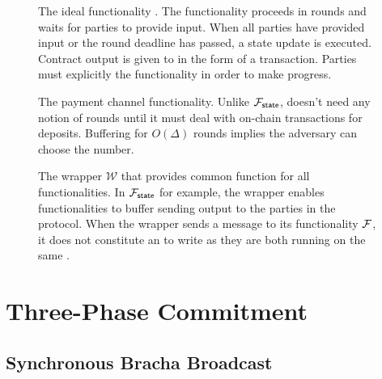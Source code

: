 \documentclass[11pt]{article}
\begin{document}
\begin{figure}
	
	\caption{The ideal functionality \Fstate. The functionality proceeds in rounds and waits for parties to provide input. When all parties have provided input or the round deadline has passed, a state update is executed. Contract output is given to \Gledger in the form of a transaction. Parties must explicitly  the functionality in order to make progress. }
\end{figure}

\begin{figure}
	
	\caption{The payment channel functionality. Unlike $\mathcal{F}_{{\mathsf {state}}}$, doesn't need any notion of rounds until it must deal with on-chain transactions for deposits. Buffering for $O(\Delta)$ rounds implies the adversary can choose the number.}
\end{figure}

\begin{figure}
	
	\caption{The wrapper $\mathcal{W}$ that provides common function for all functionalities. In $\mathcal{F}_{{\mathsf {state}}}$ for example, the wrapper enables functionalities to buffer sending output to the parties in the protocol. When the wrapper sends a message to its functionality $\mathcal{F}$, it does not constitute an  to  write as they are both running on the same .}
\end{figure}

\begin{figure}
	
\end{figure}

\begin{figure}
	
\end{figure}

\begin{figure}
	
\end{figure}

\section{Three-Phase Commitment}

\subsection{Synchronous Bracha Broadcast}

\begin{figure}[!h]
	
\end{figure}
%	
\begin{figure}[!h]
	
\end{figure}
\begin{figure}[!h]
	
\end{figure}
\end{document}
